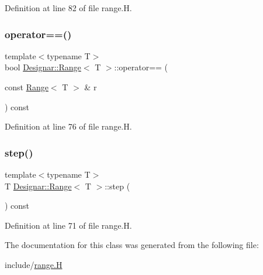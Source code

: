 Definition at line 82 of file range.\+H.

\mbox{\label{class_designar_1_1_range_ac15a931a2a2de890571f85cff64f6891}} 
\subsubsection{\texorpdfstring{operator==()}{operator==()}}
{\footnotesize\ttfamily template$<$typename T$>$ \\
bool \hyperlink{class_designar_1_1_range}{Designar\+::\+Range}$<$ T $>$\+::operator== (\begin{DoxyParamCaption}\item[{const \hyperlink{class_designar_1_1_range}{Range}$<$ T $>$ \&}]{r }\end{DoxyParamCaption}) const\hspace{0.3cm}{\ttfamily [inline]}}



Definition at line 76 of file range.\+H.

\mbox{\label{class_designar_1_1_range_a831f82b8651e4b4a437aa786288b5aef}} 
\subsubsection{\texorpdfstring{step()}{step()}}
{\footnotesize\ttfamily template$<$typename T$>$ \\
T \hyperlink{class_designar_1_1_range}{Designar\+::\+Range}$<$ T $>$\+::step (\begin{DoxyParamCaption}{ }\end{DoxyParamCaption}) const\hspace{0.3cm}{\ttfamily [inline]}}



Definition at line 71 of file range.\+H.



The documentation for this class was generated from the following file\+:\begin{DoxyCompactItemize}
\item 
include/\hyperlink{range_8_h}{range.\+H}\end{DoxyCompactItemize}
